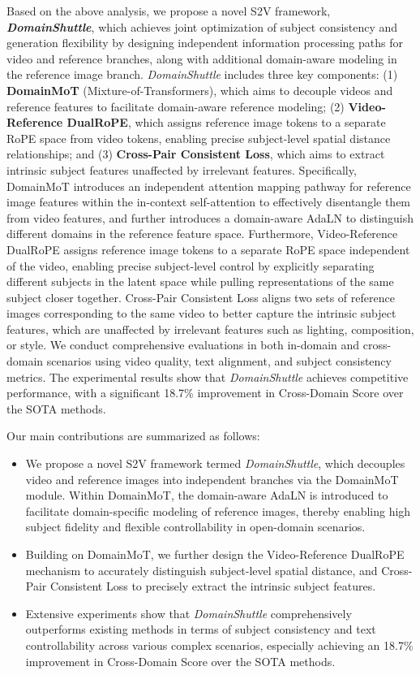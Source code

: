 Based on the above analysis, we propose a novel S2V framework, \textit{\textbf{DomainShuttle}}, which achieves joint optimization of subject consistency and generation flexibility by designing independent information processing paths for video and reference branches, along with additional domain-aware modeling in the reference image branch. \textit{DomainShuttle} includes three key components: (1) \textbf{DomainMoT} (Mixture-of-Transformers), which aims to decouple videos and reference features to facilitate domain-aware reference modeling; (2) \textbf{Video-Reference DualRoPE}, which assigns reference image tokens to a separate RoPE space from video tokens, enabling precise subject-level spatial distance relationships; and (3) \textbf{Cross-Pair Consistent Loss}, which aims to extract intrinsic subject features unaffected by irrelevant features. Specifically, DomainMoT introduces an independent attention mapping pathway for reference image features within the in-context self-attention to effectively disentangle them from video features, and further introduces a domain-aware AdaLN to distinguish different domains in the reference feature space. Furthermore, Video-Reference DualRoPE assigns reference image tokens to a separate RoPE space independent of the video, enabling precise subject-level control by explicitly separating different subjects in the latent space while pulling representations of the same subject closer together. Cross-Pair Consistent Loss aligns two sets of reference images corresponding to the same video to better capture the intrinsic subject features, which are unaffected by irrelevant features such as lighting, composition, or style. We conduct comprehensive evaluations in both in-domain and cross-domain scenarios using video quality, text alignment, and subject consistency metrics. The experimental results show that \textit{DomainShuttle} achieves competitive performance, with a significant 18.7\% improvement in Cross-Domain Score over the SOTA methods.


Our main contributions are summarized as follows:
\begin{itemize}[label=\textbullet]
    \item  We propose a novel S2V framework termed \textit{DomainShuttle}, which decouples video and reference images into independent branches via the DomainMoT module. Within DomainMoT, the domain-aware AdaLN is introduced to facilitate domain-specific modeling of reference images, thereby enabling high subject fidelity and flexible controllability in open-domain scenarios.
    \item   Building on DomainMoT, we further design the Video-Reference DualRoPE mechanism to accurately distinguish subject-level spatial distance, and Cross-Pair Consistent Loss to precisely extract the intrinsic subject features.
    \item   Extensive experiments show that \textit{DomainShuttle} comprehensively outperforms existing methods in terms of subject consistency and text controllability across various complex scenarios, especially achieving an 18.7\% improvement in Cross-Domain Score over the SOTA methods. 

\end{itemize}